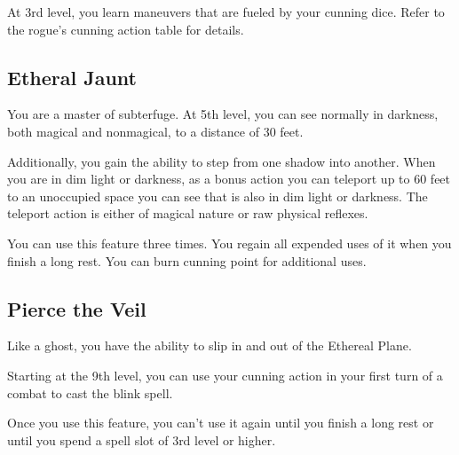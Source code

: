 \begin{multicols*}{2}
At 3rd level, you learn maneuvers that are fueled by your cunning dice. Refer to the rogue's cunning action table for details.

\subsection*{Etheral Jaunt}

You are a master of subterfuge. At 5th level, you can see normally in darkness, both magical and nonmagical, to a distance of 30 feet.

Additionally, you gain the ability to step from one shadow into another. When you are in dim light or darkness, as a bonus action you can teleport up to 60 feet to an unoccupied space you can see that is also in dim light or darkness. The teleport action is either of magical nature or raw physical reflexes. 

You can use this feature three times. You regain all expended uses of it when you finish a long rest. You can burn cunning point for additional uses.

\subsection*{Pierce the Veil}

Like a ghost, you have the ability to slip in and out of the Ethereal Plane.

Starting at the 9th level, you can use your cunning action in your first turn of a combat to cast the blink spell.

Once you use this feature, you can’t use it again until you finish a long rest or until you spend a spell slot of 3rd level or higher.


\end{multicols*}
